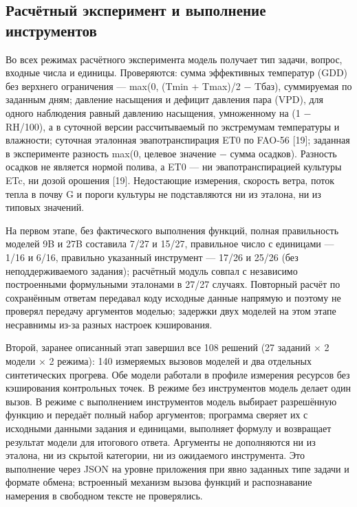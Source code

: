 \documentclass[14pt,a4paper]{extarticle}
\begin{document}
\subsection*{Расчётный эксперимент и выполнение инструментов}
Во всех режимах расчётного эксперимента модель получает тип задачи, вопрос, входные числа и единицы. Проверяются: сумма эффективных температур (GDD) без верхнего ограничения — max(0, (Tmin + Tmax)/2 − Tбаз), суммируемая по заданным дням; давление насыщения и дефицит давления пара (VPD), для одного наблюдения равный давлению насыщения, умноженному на (1 − RH/100), а в суточной версии рассчитываемый по экстремумам температуры и влажности; суточная эталонная эвапотранспирация ET0 по FAO-56 [19]; заданная в эксперименте разность max(0, целевое значение − сумма осадков). Разность осадков не является нормой полива, а ET0 — ни эвапотранспирацией культуры ETc, ни дозой орошения [19]. Недостающие измерения, скорость ветра, поток тепла в почву G и пороги культуры не подставляются ни из эталона, ни из типовых значений.

На первом этапе, без фактического выполнения функций, полная правильность моделей 9B и 27B составила 7/27 и 15/27, правильное число с единицами — 1/16 и 6/16, правильно указанный инструмент — 17/26 и 25/26 (без неподдерживаемого задания); расчётный модуль совпал с независимо построенными формульными эталонами в 27/27 случаях. Повторный расчёт по сохранённым ответам передавал коду исходные данные напрямую и поэтому не проверял передачу аргументов моделью; задержки двух моделей на этом этапе несравнимы из-за разных настроек кэширования.

Второй, заранее описанный этап завершил все 108 решений (27 заданий × 2 модели × 2 режима): 140 измеряемых вызовов моделей и два отдельных синтетических прогрева. Обе модели работали в профиле измерения ресурсов без кэширования контрольных точек. В режиме без инструментов модель делает один вызов. В режиме с выполнением инструментов модель выбирает разрешённую функцию и передаёт полный набор аргументов; программа сверяет их с исходными данными задания и единицами, выполняет формулу и возвращает результат модели для итогового ответа. Аргументы не дополняются ни из эталона, ни из скрытой категории, ни из ожидаемого инструмента. Это выполнение через JSON на уровне приложения при явно заданных типе задачи и формате обмена; встроенный механизм вызова функций и распознавание намерения в свободном тексте не проверялись.
\end{document}
